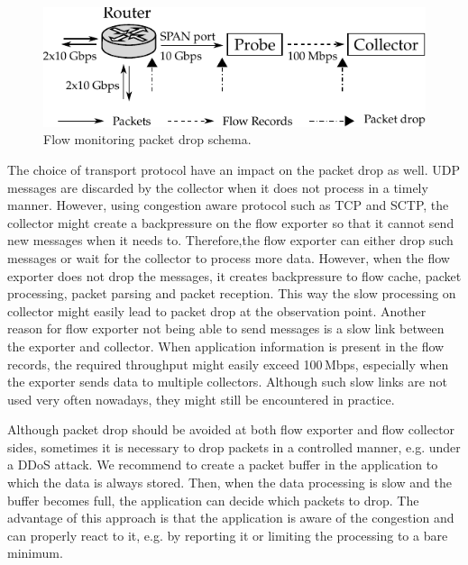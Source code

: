 \begin{figure}[t!]
  \begin{center}
    \includegraphics{figures/flow-packet-drop}
  \end{center}
  \caption{Flow monitoring packet drop schema.}
  \label{fig:flow-packet-drop}
\end{figure}

The choice of transport protocol have an impact on the packet drop as well. UDP messages are discarded by the collector when it does not process in a timely manner. However, using congestion aware protocol such as TCP and SCTP, the collector might create a backpressure on the flow exporter so that it cannot send new messages when it needs to. Therefore,the flow exporter can either drop such messages or wait for the collector to process more data. However, when the flow exporter does not drop the messages, it creates backpressure to flow cache, packet processing, packet parsing and packet reception. This way the slow processing on collector might easily lead to packet drop at the observation point. Another reason for flow exporter not being able to send messages is a slow link between the exporter and collector. When application information is present in the flow records, the required throughput might easily exceed 100\,Mbps, especially when the exporter sends data to multiple collectors. Although such slow links are not used very often nowadays, they might still be encountered in practice.

Although packet drop should be avoided at both flow exporter and flow collector sides, sometimes it is necessary to drop packets in a controlled manner, e.g. under a DDoS attack. We recommend to create a packet buffer in the application to which the data is always stored. Then, when the data processing is slow and the buffer becomes full, the application can decide which packets to drop. The advantage of this approach is that the application is aware of the congestion and can properly react to it, e.g. by reporting it or limiting the processing to a bare minimum.

